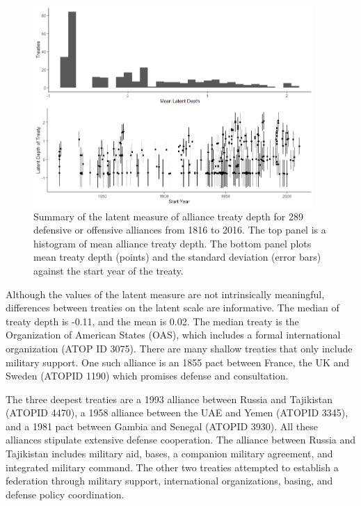 \documentclass[12pt]{article}
\begin{document}
\begin{figure}
	\centering
		\includegraphics[width=0.95\textwidth]{../figures/ld-summary.png}
	\caption{Summary of the latent measure of alliance treaty depth for 289 defensive or offensive alliances from 1816 to 2016. The top panel is a histogram of mean alliance treaty depth. The bottom panel plots mean treaty depth (points) and the standard deviation (error bars) against the start year of the treaty.}
	\label{fig:ld-summary}
\end{figure}


Although the values of the latent measure are not intrinsically meaningful, differences between treaties on the latent scale are informative. 
The median of treaty depth is -0.11, and the mean is 0.02. 
The median treaty is the Organization of American States (OAS), which includes a formal international organization (ATOP ID 3075). 
There are many shallow treaties that only include military support. 
One such alliance is an 1855 pact between France, the UK and Sweden (ATOPID 1190) which promises defense and consultation. 


The three deepest treaties are a 1993 alliance between Russia and Tajikistan (ATOPID 4470), a 1958 alliance between the UAE and Yemen (ATOPID 3345), and a 1981 pact between Gambia and Senegal (ATOPID 3930). 
All these alliances stipulate extensive defense cooperation. 
The alliance between Russia and Tajikistan includes military aid, bases, a companion military agreement, and integrated military command. 
The other two treaties attempted to establish a federation through military support, international organizations, basing, and defense policy coordination. 
\end{document}
